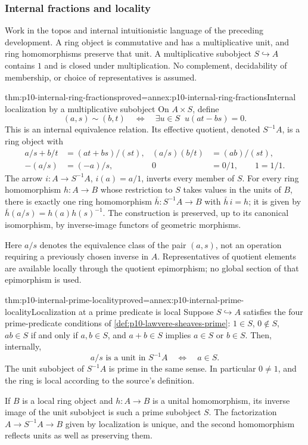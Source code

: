 \subsubsection{Internal fractions and locality}
\label{sec:p10-internal-ring-fractions}

Work in the topos and internal intuitionistic language of the preceding
development. A ring object is commutative and has a multiplicative unit,
and ring homomorphisms preserve that unit.
A multiplicative subobject \(S\hookrightarrow A\) contains \(1\) and is
closed under multiplication. No complement, decidability of membership,
or choice of representatives is assumed.

\begin{hbtheorem}{thm:p10-internal-ring-fractions}{proved=annex:p10-internal-ring-fractions}{Internal localization by a multiplicative subobject}
On \(A\times S\), define
\[
 (a,s)\sim(b,t)
 \quad\Longleftrightarrow\quad
 \exists u\in S\;\;u(at-bs)=0.
\]
This is an internal equivalence relation. Its effective quotient,
denoted \(S^{-1}A\), is a ring object with
\[
 \begin{aligned}
 a/s+b/t&=(at+bs)/(st),&
 (a/s)(b/t)&=(ab)/(st),\\
 -(a/s)&=(-a)/s,&
 0&=0/1,\qquad 1=1/1.
 \end{aligned}
\]
The arrow \(i:A\to S^{-1}A\), \(i(a)=a/1\), inverts every member of \(S\).
For every ring homomorphism \(h:A\to B\) whose restriction to \(S\)
takes values in the units of \(B\), there is exactly one ring
homomorphism \(\bar h:S^{-1}A\to B\) with \(\bar h\,i=h\);
it is given by
\(\bar h(a/s)=h(a)h(s)^{-1}\).
The construction is preserved, up to its canonical isomorphism,
by inverse-image functors of geometric morphisms.
\end{hbtheorem}

Here \(a/s\) denotes the equivalence class of the pair \((a,s)\),
not an operation requiring a previously chosen inverse in \(A\).
Representatives of quotient elements are available locally through
the quotient epimorphism; no global section of that epimorphism is used.

\begin{hbtheorem}{thm:p10-internal-prime-locality}{proved=annex:p10-internal-prime-locality}{Localization at a prime predicate is local}
Suppose \(S\hookrightarrow A\) satisfies the four prime-predicate
conditions of \cref{def:p10-lawvere-sheaves-prime}:
\(1\in S\), \(0\notin S\),
\(ab\in S\) if and only if \(a,b\in S\), and
\(a+b\in S\) implies \(a\in S\) or \(b\in S\).
Then, internally,
\[
 a/s\text{ is a unit in }S^{-1}A
 \quad\Longleftrightarrow\quad a\in S.
\]
The unit subobject of \(S^{-1}A\) is prime in the same sense.
In particular \(0\neq1\), and the ring is local according to the
source's definition.

If \(B\) is a local ring object and \(h:A\to B\) is a unital
homomorphism, its inverse image of the unit subobject is such a prime
subobject \(S\). The factorization
\(A\to S^{-1}A\to B\) given by localization is unique, and the second
homomorphism reflects units as well as preserving them.
\end{hbtheorem}

